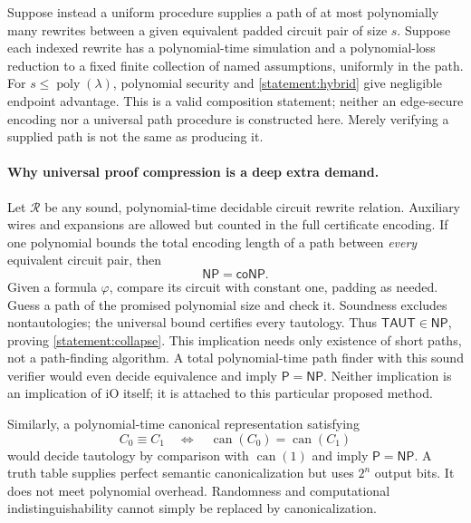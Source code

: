 \documentclass[11pt,a4paper]{article}
\numberwithin{equation}{section}
\begin{document}
Suppose instead a uniform procedure supplies a path of at most polynomially
many rewrites between a given equivalent padded circuit pair of size $s$.
Suppose each indexed rewrite has a polynomial-time simulation and a
polynomial-loss reduction to a fixed finite collection of named assumptions,
uniformly in the path. For $s\le\operatorname{poly}(\lambda)$, polynomial
security and \eqref{statement:hybrid} give negligible endpoint advantage.
This is a valid composition statement; neither an edge-secure encoding nor
a universal path procedure is constructed here. Merely verifying a supplied
path is not the same as producing it.

\paragraph{Why universal proof compression is a deep extra demand.}
Let $\mathcal R$ be any sound, polynomial-time decidable circuit rewrite
relation. Auxiliary wires and expansions are allowed but counted in the
full certificate encoding. If one polynomial bounds the total encoding
length of a path between \emph{every} equivalent circuit pair, then
\begin{equation}\label{statement:collapse}
 \mathsf{NP}=\mathsf{coNP}.
\end{equation}
Given a formula $\varphi$, compare its circuit with constant one, padding
as needed. Guess a path of the promised polynomial size and check it.
Soundness excludes nontautologies; the universal bound certifies every
tautology. Thus $\mathsf{TAUT}\in\mathsf{NP}$, proving
\eqref{statement:collapse}. This implication needs only existence of short paths,
not a path-finding algorithm. A total polynomial-time path finder with this
sound verifier would even decide equivalence and imply
$\mathsf P=\mathsf{NP}$. Neither implication is an implication of iO itself;
it is attached to this particular proposed method.

Similarly, a polynomial-time canonical representation satisfying
\[
 C_0\equiv C_1\quad\Longleftrightarrow\quad
 \operatorname{can}(C_0)=\operatorname{can}(C_1)
\]
would decide tautology by comparison with $\operatorname{can}(1)$ and imply
$\mathsf P=\mathsf{NP}$. A truth table supplies perfect semantic
canonicalization but uses $2^n$ output bits. It does not meet polynomial
overhead. Randomness and computational indistinguishability cannot simply
be replaced by canonicalization.
\end{document}
